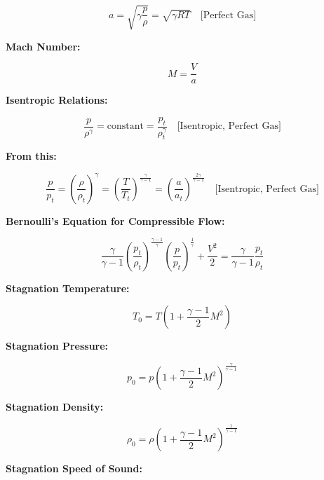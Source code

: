 \begin{equation}
	a = \sqrt{\gamma \frac{p}{\rho}} = \sqrt{\gamma RT} \quad \text{[Perfect Gas]}
\end{equation}

\textbf{Mach Number:}

\begin{equation}
	M = \frac{V}{a}
\end{equation}

\textbf{Isentropic Relations:}

\begin{equation}
	\frac{p}{\rho^\gamma} = \text{constant} = \frac{p_t}{\rho_t^\gamma} \quad \text{[Isentropic, Perfect Gas]}
\end{equation}

\textbf{From this:}

\begin{equation}
	\frac{p}{p_t} = \left( \frac{\rho}{\rho_t} \right)^\gamma = \left( \frac{T}{T_t} \right)^{\frac{\gamma}{\gamma - 1}} = \left( \frac{a}{a_t} \right)^{\frac{2\gamma}{\gamma - 1}} \quad \text{[Isentropic, Perfect Gas]}
\end{equation}

\textbf{Bernoulli's Equation for Compressible Flow:}

\begin{equation}
	\frac{\gamma}{\gamma - 1} \left( \frac{p_t}{\rho_t} \right)^{\frac{\gamma - 1}{\gamma}} \left( \frac{p}{p_t} \right)^{\frac{1}{\gamma}} + \frac{V^2}{2} = \frac{\gamma}{\gamma - 1} \frac{p_t}{\rho_t}
\end{equation}

\textbf{Stagnation Temperature:}

\begin{equation}
	T_0 = T \left( 1 + \frac{\gamma - 1}{2} M^2 \right)
\end{equation}

\textbf{Stagnation Pressure:}

\begin{equation}
	p_0 = p \left( 1 + \frac{\gamma - 1}{2} M^2 \right)^{\frac{\gamma}{\gamma - 1}}
\end{equation}

\textbf{Stagnation Density:}

\begin{equation}
	\rho_0 = \rho \left( 1 + \frac{\gamma - 1}{2} M^2 \right)^{\frac{1}{\gamma - 1}}
\end{equation}

\textbf{Stagnation Speed of Sound:}

